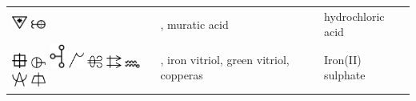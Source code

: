 \documentclass[british,final,landscape]{scrartcl}
\begin{document}
\begin{refsection}
\begin{supertabular}{p{0.3\textwidth}p{0.34\textwidth}p{0.34\textwidth}}
   \includegraphics[width=5mm]{Compounds/HydrochloricAcid} \includegraphics[width=5mm]{Compounds/HydrochloricAcid2} & , muratic acid & hydrochloric acid  \\
   \includegraphics[width=5mm]{Compounds/IronVitriol} \includegraphics[width=5mm]{Compounds/IronVitriol2} \includegraphics[width=5mm]{Compounds/IronVitriol3} \includegraphics[width=5mm]{Compounds/IronVitriol4} \includegraphics[width=5mm]{Compounds/IronVitriol5} \includegraphics[width=5mm]{Compounds/IronVitriol6} \includegraphics[width=5mm]{Compounds/IronVitriol7} \includegraphics[width=5mm]{Compounds/IronVitriol8} \includegraphics[width=5mm]{Compounds/IronVitriol9} & , iron vitriol, green vitriol, copperas & Iron(II) sulphate  \\

\end{supertabular}
\end{refsection}
\end{document}
